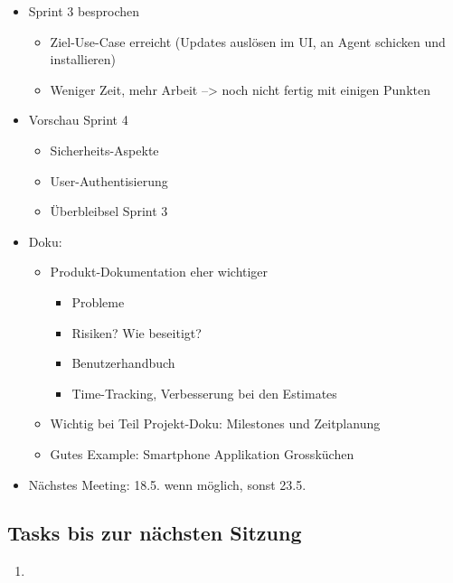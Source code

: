 \documentclass[class=scrbook,crop=false]{standalone}
\begin{document}
	\begin{itemize}
        \item Sprint 3 besprochen
        \begin{itemize}
            \item Ziel-Use-Case erreicht (Updates auslösen im UI, an Agent schicken und installieren)
            \item Weniger Zeit, mehr Arbeit --> noch nicht fertig mit einigen Punkten
        \end{itemize}
        \item Vorschau Sprint 4
        \begin{itemize}
            \item Sicherheits-Aspekte
            \item User-Authentisierung
            \item Überbleibsel Sprint 3
        \end{itemize}
        \item Doku:
        \begin{itemize}
            \item Produkt-Dokumentation eher wichtiger
            \begin{itemize}
                \item Probleme
                \item Risiken? Wie beseitigt?
                \item Benutzerhandbuch
                \item Time-Tracking, Verbesserung bei den Estimates
            \end{itemize}
            \item Wichtig bei Teil Projekt-Doku: Milestones und Zeitplanung
            \item Gutes Example: Smartphone Applikation Grossküchen
        \end{itemize}
        \item Nächstes Meeting: 18.5. wenn möglich, sonst 23.5.
    \end{itemize}
    
    \subsection*{Tasks bis zur nächsten Sitzung}
    
    \begin{enumerate}
        \item 
    \end{enumerate}
\end{document}
